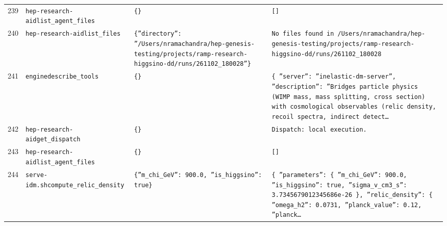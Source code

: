 \documentclass[11pt,a4paper]{article}
\begin{document}
\begin{longtable}{@{}p{}p{}p{}p{}@{}}
239 & \texttt{hep-research-aid}\newline\texttt{list\_\allowbreak{}agent\_\allowbreak{}files} & \texttt{\{\}\allowbreak{}} & \texttt{[]\allowbreak{}} \\
240 & \texttt{hep-research-aid}\newline\texttt{list\_\allowbreak{}files} & \texttt{\{''directory'':\allowbreak{} ''/\allowbreak{}Users/\allowbreak{}nramachandra/\allowbreak{}hep-genesis-testing/\allowbreak{}projects/\allowbreak{}ramp-research-higgsino-dd/\allowbreak{}runs/\allowbreak{}261102\_\allowbreak{}180028''\}\allowbreak{}} & \texttt{No files found in /\allowbreak{}Users/\allowbreak{}nramachandra/\allowbreak{}hep-genesis-testing/\allowbreak{}projects/\allowbreak{}ramp-research-higgsino-dd/\allowbreak{}runs/\allowbreak{}261102\_\allowbreak{}180028} \\
241 & \texttt{engine}\newline\texttt{describe\_\allowbreak{}tools} & \texttt{\{\}\allowbreak{}} & \texttt{\{   ''server'':\allowbreak{} ''inelastic-dm-server'',\allowbreak{}   ''description'':\allowbreak{} ''Bridges particle physics (WIMP mass,\allowbreak{} mass splitting,\allowbreak{} cross section)\allowbreak{} with cosmological observables (relic density,\allowbreak{} recoil spectra,\allowbreak{} indirect detect\ldots{}\allowbreak{}} \\
242 & \texttt{hep-research-aid}\newline\texttt{get\_\allowbreak{}dispatch} & \texttt{\{\}\allowbreak{}} & \texttt{Dispatch:\allowbreak{} local execution.} \\
243 & \texttt{hep-research-aid}\newline\texttt{list\_\allowbreak{}agent\_\allowbreak{}files} & \texttt{\{\}\allowbreak{}} & \texttt{[]\allowbreak{}} \\
244 & \texttt{serve-idm.sh}\newline\texttt{compute\_\allowbreak{}relic\_\allowbreak{}density} & \texttt{\{''m\_\allowbreak{}chi\_\allowbreak{}GeV'':\allowbreak{} 900.0,\allowbreak{} ''is\_\allowbreak{}higgsino'':\allowbreak{} true\}\allowbreak{}} & \texttt{\{   ''parameters'':\allowbreak{} \{     ''m\_\allowbreak{}chi\_\allowbreak{}GeV'':\allowbreak{} 900.0,\allowbreak{}     ''is\_\allowbreak{}higgsino'':\allowbreak{} true,\allowbreak{}     ''sigma\_\allowbreak{}v\_\allowbreak{}cm3\_\allowbreak{}s'':\allowbreak{} 3.7345679012345686e-26   \}\allowbreak{},\allowbreak{}   ''relic\_\allowbreak{}density'':\allowbreak{} \{     ''omega\_\allowbreak{}h2'':\allowbreak{} 0.0731,\allowbreak{}     ''planck\_\allowbreak{}value'':\allowbreak{} 0.12,\allowbreak{}     ''planck\ldots{}\allowbreak{}} \\

\end{longtable}
\end{document}
